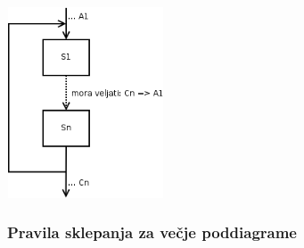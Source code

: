 \documentclass[a4paper,10pt]{article}
\begin{document}
	\begin{center}
	\includegraphics[width=4.65cm,height=5.65cm]{Slike/ZancnaInvarianta.png}
	\end{center}

\subsubsection{Pravila sklepanja za ve\v cje poddiagrame}
\end{document}
